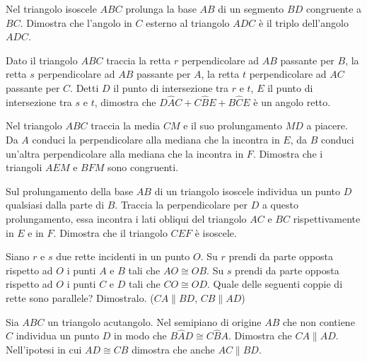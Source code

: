 \begin{multicols}{2}
\begin{esercizio}
\label{ese:3.70}
Nel triangolo isoscele $ABC$ prolunga la base $AB$ di un segmento $BD$ congruente a $BC$. Dimostra che l'angolo in $C$ esterno al triangolo $ADC$ è il triplo dell'angolo $ADC$.
\end{esercizio}

\begin{esercizio}
\label{ese:3.71}
Dato il triangolo $ABC$ traccia la retta $r$ perpendicolare ad $AB$ passante per $B$, la retta $s$ perpendicolare ad $AB$ passante per $A$, la retta $t$ perpendicolare ad $AC$ passante per $C$. Detti $D$ il punto di intersezione tra $r$ e $t$, $E$ il punto di intersezione tra $s$ e $t$, dimostra che $D\widehat{A}C+C\widehat{B}E+B\widehat{C}E$ è un angolo retto.
\end{esercizio}

\begin{esercizio}
\label{ese:3.72}
Nel triangolo $ABC$ traccia la media $CM$ e il suo prolungamento $MD$ a piacere. Da $A$ conduci la perpendicolare alla mediana che la incontra in $E$, da $B$ conduci un'altra perpendicolare alla mediana che la incontra in $F$. Dimostra che i triangoli $AEM$ e $BFM$ sono congruenti.
\end{esercizio}

\begin{esercizio}
\label{ese:3.73}
Sul prolungamento della base $AB$ di un triangolo isoscele individua un punto $D$ qualsiasi dalla parte di $B$. Traccia la perpendicolare per $D$ a questo prolungamento, essa incontra i lati obliqui del triangolo $AC$ e $BC$ rispettivamente in $E$ e in $F$. Dimostra che il triangolo $CEF$ è isoscele.
\end{esercizio}

\begin{esercizio}
\label{ese:3.74}
Siano $r$ e $s$ due rette incidenti in un punto $O$. Su $r$ prendi da parte opposta rispetto ad $O$ i punti $A$ e $B$ tali che $AO\cong OB$. Su $s$ prendi da parte opposta rispetto ad $O$ i punti $C$ e $D$ tali che $CO\cong OD$. Quale delle seguenti coppie di rette sono parallele? Dimostralo. ($CA\parallel BD$, $CB\parallel AD$)
\end{esercizio}

\begin{esercizio}
\label{ese:3.75}
Sia $ABC$ un triangolo acutangolo. Nel semipiano di origine $AB$ che non contiene $C$ individua un punto $D$ in modo che $B\widehat{A}D\cong C\widehat{B}A$. Dimostra che $CA\parallel AD$. Nell'ipotesi in cui $AD\cong CB$ dimostra che anche $AC\parallel BD$.
\end{esercizio}


\end{multicols}
